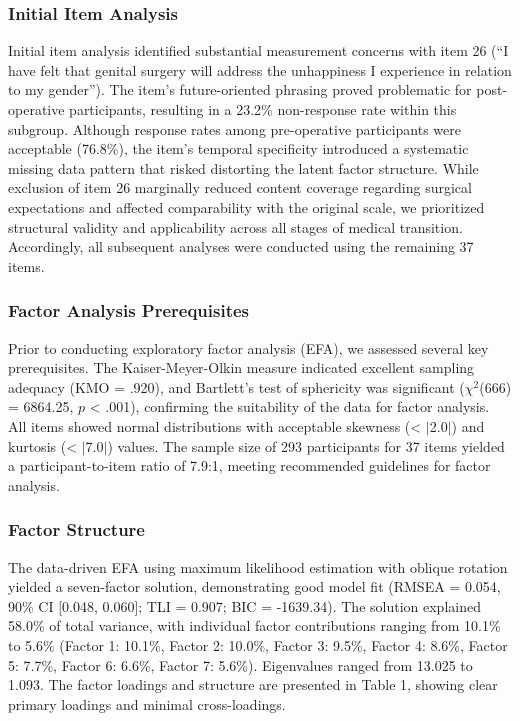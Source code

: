 \documentclass[12pt,a4paper]{article}
\begin{document}
\subsubsection{Initial Item Analysis}

Initial item analysis identified substantial measurement concerns with item 26 (``I have felt that genital surgery will address the unhappiness I experience in relation to my gender''). The item's future-oriented phrasing proved problematic for post-operative participants, resulting in a 23.2\% non-response rate within this subgroup. Although response rates among pre-operative participants were acceptable (76.8\%), the item's temporal specificity introduced a systematic missing data pattern that risked distorting the latent factor structure. While exclusion of item 26 marginally reduced content coverage regarding surgical expectations and affected comparability with the original scale, we prioritized structural validity and applicability across all stages of medical transition. Accordingly, all subsequent analyses were conducted using the remaining 37 items.

\subsubsection{Factor Analysis Prerequisites}

Prior to conducting exploratory factor analysis (EFA), we assessed several key prerequisites. The Kaiser-Meyer-Olkin measure indicated excellent sampling adequacy (KMO = .920), and Bartlett's test of sphericity was significant ($\chi^2$(666) = 6864.25, $p$ < .001), confirming the suitability of the data for factor analysis. All items showed normal distributions with acceptable skewness (< $|$2.0$|$) and kurtosis (< $|$7.0$|$) values. The sample size of 293 participants for 37 items yielded a participant-to-item ratio of 7.9:1, meeting recommended guidelines for factor analysis.

\subsubsection{Factor Structure}

The data-driven EFA using maximum likelihood estimation with oblique rotation yielded a seven-factor solution, demonstrating good model fit (RMSEA = 0.054, 90\% CI [0.048, 0.060]; TLI = 0.907; BIC = -1639.34). The solution explained 58.0\% of total variance, with individual factor contributions ranging from 10.1\% to 5.6\% (Factor 1: 10.1\%, Factor 2: 10.0\%, Factor 3: 9.5\%, Factor 4: 8.6\%, Factor 5: 7.7\%, Factor 6: 6.6\%, Factor 7: 5.6\%). Eigenvalues ranged from 13.025 to 1.093. The factor loadings and structure are presented in Table 1, showing clear primary loadings and minimal cross-loadings.
\end{document}
